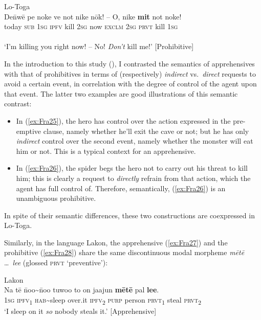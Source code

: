 \documentclass[output=paper,colorlinks,citecolor=brown]{langscibook}
\begin{document}
\ea \label{ex:Fra26} \textnormal{Lo-Toga}  \\
\gll De\={n}wē pe noke ve not nike nōk! -- O, nike \textbf{mit} not noke! \\
today \textsc{sub} \textsc{1sg} \textsc{ipfv} kill \textsc{2sg} now {} \textsc{exclm} \textsc{2sg} \textsc{prvt} kill \textsc{1sg} \\
 \\
`I'm killing you right now! -- No! \textit{Don't} kill me!' \hfill [Prohibitive] 
\z

In the introduction to this study (), I contrasted the semantics of apprehensives with that of prohibitives in terms of (respectively) \textit{indirect} vs.\ \textit{direct} requests to avoid a certain event, in correlation with the degree of control of the agent upon that event. The latter two examples are good illustrations of this semantic contrast:

\begin{itemize}
    \item In (\ref{ex:Fra25}), the hero has control over the action expressed in the pre-emptive clause, namely whether he'll exit the cave or not; but he has only \textit{indirect} control over the second event, namely whether the monster will eat him or not. This is a typical context for an apprehensive. 
    \item In (\ref{ex:Fra26}), the spider begs the hero not to carry out his threat to kill him; this is clearly a  request to \textit{directly} refrain from that action, which the agent has full control of. Therefore, semantically, (\ref{ex:Fra26}) is an unambiguous prohibitive.
\end{itemize}

\noindent In spite of their semantic differences, these two constructions are coexpressed in Lo\nobreakdash-Toga.

Similarly, in the language Lakon, the apprehensive (\ref{ex:Fra27}) and the prohibitive (\ref{ex:Fra28}) share the same discontinuous modal morpheme \textit{mētē} \ldots\ \textit{lee} (glossed \textsc{prvt} `preventive'):

\ea \label{ex:Fra27} \textnormal{Lakon}  \\
\gll Na tē \={n}oo\textasciitilde\={n}oo tuwoo to on jaajun \textbf{mētē} pal \textbf{lee}. \\
\textsc{1sg} \textsc{ipfv}\textsubscript{1} \textsc{hab}\textasciitilde sleep over.it \textsc{ipfv}\textsubscript{2} \textsc{purp} person \textsc{prvt}\textsubscript{1} steal \textsc{prvt}\textsubscript{2} \\
\glt `I sleep on it \textit{so} nobody steals it.' \hfill [Apprehensive]
\z
\end{document}
